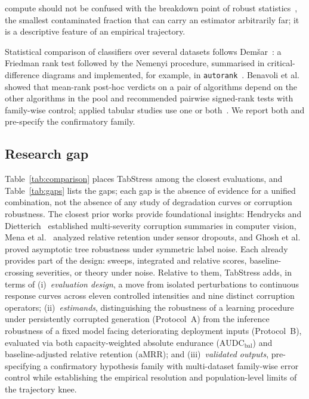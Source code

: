 \documentclass[pdflatex,sn-mathphys]{sn-jnl}
\theoremstyle{thmstyleone}
\theoremstyle{thmstyletwo}
\theoremstyle{thmstylethree}
\newcommand{\AUDC}{\mathrm{AUDC}}
\newcommand{\aMRR}{\mathrm{aMRR}}
\begin{document}
compute should not be confused with the breakdown point of robust statistics~\cite{donoho1983notion}, the smallest contaminated fraction that can carry an estimator arbitrarily far; it is a descriptive feature of an empirical trajectory.

Statistical comparison of classifiers over several datasets follows Dem\v{s}ar~\cite{demsar2006statistical}: a Friedman rank test followed by the Nemenyi procedure, summarised in critical-difference diagrams and implemented, for example, in \texttt{autorank}~\cite{herbold2020autorank}. Benavoli et al.~\cite{benavoli2016should} showed that mean-rank post-hoc verdicts on a pair of algorithms depend on the other algorithms in the pool and recommended pairwise signed-rank tests with family-wise control; applied tabular studies use one or both~\cite{perezlebel2022benchmarking,borisov2024deep}. We report both and pre-specify the confirmatory family.

\subsection{Research gap}\label{sec:related:gap}

Table~\ref{tab:comparison} places TabStress among the closest evaluations, and Table~\ref{tab:gaps} lists the gaps; each gap is the absence of evidence for a unified combination, not the absence of any study of degradation curves or corruption robustness. The closest prior works provide foundational insights: Hendrycks and Dietterich~\cite{hendrycks2019benchmarking} established multi-severity corruption summaries in computer vision, Mena et al.~\cite{mena2025multisensor} analyzed relative retention under sensor dropouts, and Ghosh et al.~\cite{ghosh2017robustness} proved asymptotic tree robustness under symmetric label noise. Each already provides part of the design: sweeps, integrated and relative scores, baseline-crossing severities, or theory under noise. Relative to them, TabStress adds, in terms of
(i)~\emph{evaluation design}, a move from isolated perturbations to continuous response curves across eleven controlled intensities and nine distinct corruption operators;
(ii)~\emph{estimands}, distinguishing the robustness of a learning procedure under persistently corrupted generation (Protocol~A) from the inference robustness of a fixed model facing deteriorating deployment inputs (Protocol~B), evaluated via both capacity-weighted absolute endurance ($\AUDC_{\mathrm{bal}}$) and baseline-adjusted relative retention ($\aMRR$); and
(iii)~\emph{validated outputs}, pre-specifying a confirmatory hypothesis family with multi-dataset family-wise error control while establishing the empirical resolution and population-level limits of the trajectory knee.
\end{document}
